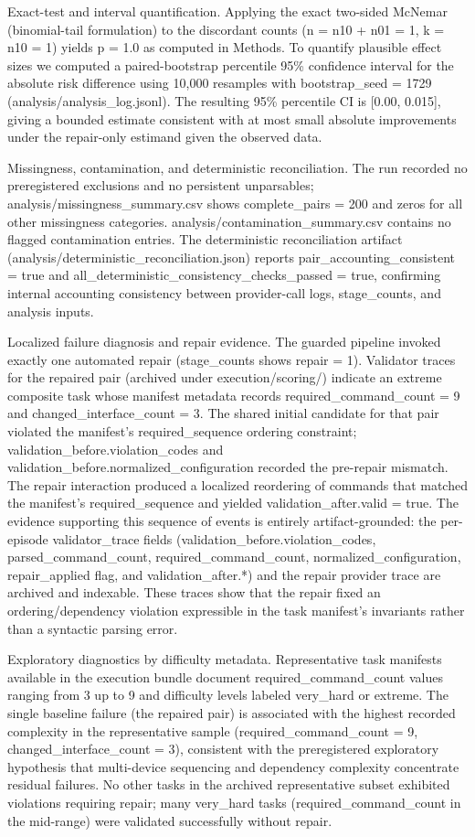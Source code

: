 \documentclass[conference]{IEEEtran}
\begin{document}
Exact-test and interval quantification. Applying the exact two-sided McNemar (binomial-tail formulation) to the discordant counts (n = n10 + n01 = 1, k = n10 = 1) yields p = 1.0 as computed in Methods. To quantify plausible effect sizes we computed a paired-bootstrap percentile 95\% confidence interval for the absolute risk difference using 10,000 resamples with bootstrap\_seed = 1729 (analysis/analysis\_log.jsonl). The resulting 95\% percentile CI is [0.00, 0.015], giving a bounded estimate consistent with at most small absolute improvements under the repair-only estimand given the observed data.

Missingness, contamination, and deterministic reconciliation. The run recorded no preregistered exclusions and no persistent unparsables; analysis/missingness\_summary.csv shows complete\_pairs = 200 and zeros for all other missingness categories. analysis/contamination\_summary.csv contains no flagged contamination entries. The deterministic reconciliation artifact (analysis/deterministic\_reconciliation.json) reports pair\_accounting\_consistent = true and all\_deterministic\_consistency\_checks\_passed = true, confirming internal accounting consistency between provider-call logs, stage\_counts, and analysis inputs.

Localized failure diagnosis and repair evidence. The guarded pipeline invoked exactly one automated repair (stage\_counts shows repair = 1). Validator traces for the repaired pair (archived under execution/scoring/) indicate an extreme composite task whose manifest metadata records required\_command\_count = 9 and changed\_interface\_count = 3. The shared initial candidate for that pair violated the manifest's required\_sequence ordering constraint; validation\_before.violation\_codes and validation\_before.normalized\_configuration recorded the pre-repair mismatch. The repair interaction produced a localized reordering of commands that matched the manifest's required\_sequence and yielded validation\_after.valid = true. The evidence supporting this sequence of events is entirely artifact-grounded: the per-episode validator\_trace fields (validation\_before.violation\_codes, parsed\_command\_count, required\_command\_count, normalized\_configuration, repair\_applied flag, and validation\_after.*) and the repair provider trace are archived and indexable. These traces show that the repair fixed an ordering/dependency violation expressible in the task manifest's invariants rather than a syntactic parsing error.

Exploratory diagnostics by difficulty metadata. Representative task manifests available in the execution bundle document required\_command\_count values ranging from 3 up to 9 and difficulty levels labeled very\_hard or extreme. The single baseline failure (the repaired pair) is associated with the highest recorded complexity in the representative sample (required\_command\_count = 9, changed\_interface\_count = 3), consistent with the preregistered exploratory hypothesis that multi-device sequencing and dependency complexity concentrate residual failures. No other tasks in the archived representative subset exhibited violations requiring repair; many very\_hard tasks (required\_command\_count in the mid-range) were validated successfully without repair.
\end{document}

